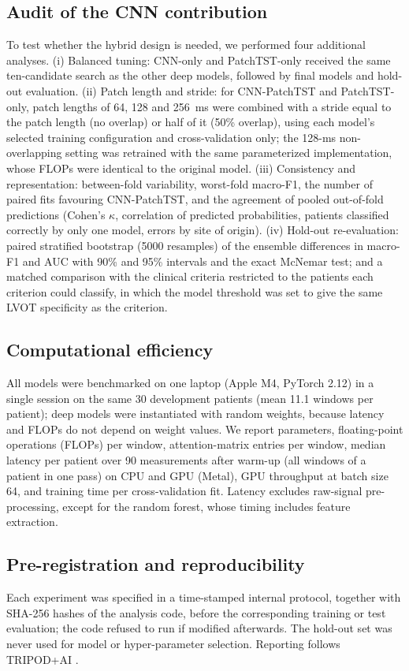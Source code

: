 \documentclass[preprint,12pt]{elsarticle}
\begin{document}
\subsection{Audit of the CNN contribution}
To test whether the hybrid design is needed, we performed four additional analyses. (i) Balanced tuning: CNN-only and PatchTST-only received the same ten-candidate search as the other deep models, followed by final models and hold-out evaluation. (ii) Patch length and stride: for CNN-PatchTST and PatchTST-only, patch lengths of 64, 128 and 256~ms were combined with a stride equal to the patch length (no overlap) or half of it (50\% overlap), using each model's selected training configuration and cross-validation only; the 128-ms non-overlapping setting was retrained with the same parameterized implementation, whose FLOPs were identical to the original model. (iii) Consistency and representation: between-fold variability, worst-fold macro-F1, the number of paired fits favouring CNN-PatchTST, and the agreement of pooled out-of-fold predictions (Cohen's $\kappa$, correlation of predicted probabilities, patients classified correctly by only one model, errors by site of origin). (iv) Hold-out re-evaluation: paired stratified bootstrap (5000 resamples) of the ensemble differences in macro-F1 and AUC with 90\% and 95\% intervals and the exact McNemar test; and a matched comparison with the clinical criteria restricted to the patients each criterion could classify, in which the model threshold was set to give the same LVOT specificity as the criterion.

\subsection{Computational efficiency}
All models were benchmarked on one laptop (Apple M4, PyTorch 2.12) in a single session on the same 30 development patients (mean 11.1 windows per patient); deep models were instantiated with random weights, because latency and FLOPs do not depend on weight values. We report parameters, floating-point operations (FLOPs) per window, attention-matrix entries per window, median latency per patient over 90 measurements after warm-up (all windows of a patient in one pass) on CPU and GPU (Metal), GPU throughput at batch size 64, and training time per cross-validation fit. Latency excludes raw-signal pre-processing, except for the random forest, whose timing includes feature extraction.

\subsection{Pre-registration and reproducibility}
Each experiment was specified in a time-stamped internal protocol, together with SHA-256 hashes of the analysis code, before the corresponding training or test evaluation; the code refused to run if modified afterwards. The hold-out set was never used for model or hyper-parameter selection. Reporting follows TRIPOD+AI \cite{collins2024tripodai}.
\end{document}
